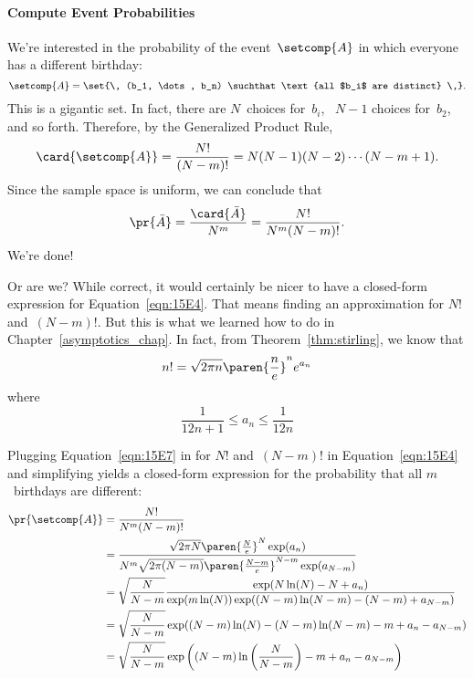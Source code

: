\paragraph{Compute Event Probabilities}

We're interested in the probability of the event~$\setcomp{A}$ in
which everyone has a different birthday:
\begin{equation*}
    \setcomp{A} = \set{\, (b_1, \dots, b_n) \suchthat
                            \text{all $b_i$ are distinct} \,}.
\end{equation*}
This is a gigantic set.  In fact, there are $N$~choices for~$b_i$,
\ $N - 1$ choices for~$b_2$, and so forth.  Therefore, by the
Generalized Product Rule,
\begin{equation*}
\card{\setcomp{A}}
    = \frac{N!}{(N - m)!}
    = N (N - 1) (N - 2) \cdots (N - m + 1).
\end{equation*}
Since the sample space is uniform, we can conclude that
\begin{equation}\label{eqn:15E4}
\pr{\bar{A}}
    = \frac{\card{\bar{A}}}{N^m} \\
    = \frac{N!}{N^m (N - m)!}.
\end{equation}
We're done!

Or are we?  While correct, it would certainly be nicer to have a
closed-form expression for Equation~\ref{eqn:15E4}.  That means
finding an approximation for $N!$ and~$(N - m)!$.  But this is what we
learned how to do in Chapter~\ref{asymptotics_chap}.  In fact, from
Theorem~\ref{thm:stirling}, we know that
\begin{equation}\label{eqn:15E7}
    n! = \sqrt{2\pi n} \paren{\frac{n}{e}}^n e^{a_n}
\end{equation}
where
\begin{equation*}
    \frac{1}{12n + 1} \le a_n \le \frac{1}{12n}
\end{equation*}

Plugging Equation~\ref{eqn:15E7} in for $N!$ and~$(N - m)!$ in
Equation~\ref{eqn:15E4} and simplifying yields a closed-form
expression for the probability that all $m$~birthdays are different:
\begingroup
{}
\begin{align}
\pr{\setcomp{A}}
    &= \frac{N!}{N^m (N - m)!} \notag\\
    &= \frac{     \sqrt{2\pi N} \paren{\frac{N}{e}}^N \exp(a_n) }
            { N^m \sqrt{2\pi (N-m)} \paren{\frac{N-m}{e}}^{N-m}
              \exp(a_{N - m}) } \notag\\
     &= \sqrt{\frac{N}{N - m}}
         \frac{ \exp(N \ln(N) - N + a_n )}
              { \exp(m \ln(N)) \exp((N - m) \ln(N - m) - (N - m) + a_{N - m})}
        \notag\\
     &= \sqrt{\frac{N}{N - m}}
         \exp((N - m) \ln(N) - (N - m) \ln (N - m) - m + a_n - a_{N - m} ) \notag\\
       &= \sqrt{\frac{N}{N - m}}
          \exp\left( (N - m) \ln\left(\frac{N}{N - m}\right) - m + a_n
          - a_{N - m} \right) \label{eqn:15E9}
\end{align}
\endgroup


